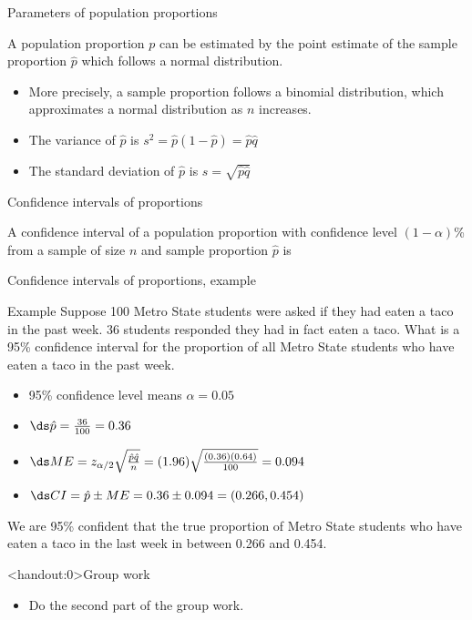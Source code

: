 \documentclass[xcolor=table, aspectratio=169, bigger, handout]{beamer}
\begin{document}
\begin{frame}{Parameters of population proportions}
\begin{block}{}
A population proportion $p$ can be estimated by the point estimate of the sample proportion $\hat p$ which follows a normal distribution.
\begin{itemize}
\pause\item More precisely, a sample proportion follows a binomial distribution, which approximates a normal distribution as $n$ increases.
\pause\item The variance of $\hat p$ is $s^2 = \hat p (1-\hat p) = \hat p \hat q$
\pause\item The standard deviation of $\hat p$ is $s = \sqrt{\hat p \hat q}$
\end{itemize}
\end{block}
\end{frame}

\begin{frame}{Confidence intervals of proportions}
\begin{block}{}
A confidence interval of a population proportion with confidence level $(1-\alpha)$\% from a sample of size $n$ and sample proportion $\hat p$ is\\ \smallskip
{}
\end{block}
\end{frame}


\begin{frame}{Confidence intervals of proportions, example}
\begin{exampleblock}{Example}
Suppose 100 Metro State students were asked if they had eaten a taco in the past week. 36 students responded they had in fact eaten a taco. What is a 95\% confidence interval for the proportion of all Metro State students who have eaten a taco in the past week.
\begin{itemize}
\pause\item 95\% confidence level means $\alpha = 0.05$
\pause\item $\ds \hat p = \frac {36}{100} = 0.36$
\pause\item $\ds ME = z_{\alpha/2}\sqrt{\frac {\hat p \hat q}{n}} = (1.96)\sqrt{\frac {(0.36)(0.64)}{100}} = 0.094$
\pause\item $\ds CI = \hat p \pm ME = 0.36 \pm 0.094 = (0.266, 0.454)$
\end{itemize}
\pause We are 95\% confident that the true proportion of Metro State students who have eaten a taco in the last week in between 0.266 and 0.454.
\end{exampleblock}
\end{frame}


\begin{frame}<handout:0>{Group work}
\begin{block}{}
\large
\begin{itemize}
\item Do the second part of the group work.
\end{itemize}
\end{block}
\end{frame}
\end{document}
